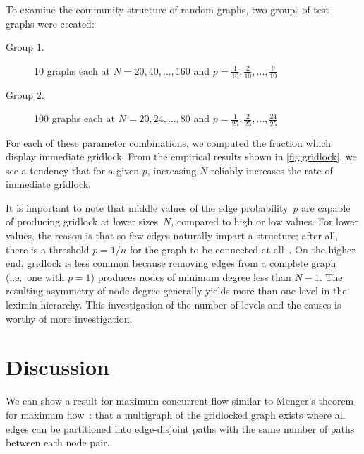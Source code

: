 To examine the community structure of random graphs, two groups of test graphs were created:
\begin{description}
\item[Group 1.] 10 graphs each at $N = 20, 40, \ldots, 160$ and $p = \frac{1}{10}, \frac{2}{10}, \ldots, \frac{9}{10}$
\item[Group 2.] 100 graphs each at $N = 20, 24, \ldots, 80$ and $p = \frac{1}{25}, \frac{2}{25}, \ldots, \frac{24}{25}$
\end{description}
For each of these parameter combinations, we computed the fraction which display immediate gridlock. From the empirical results shown in \autoref{fig:gridlock}, we see a tendency that for a given $p$, increasing $N$ reliably increases the rate of immediate gridlock.

It is important to note that middle values of the edge probability~$p$ are capable of producing gridlock at lower sizes~$N$, compared to high or low values. For lower values, the reason is that so few edges naturally impart a structure; after all, there is a threshold $p = 1/n$ for the graph to be connected at all~\cite{frieze2015introduction, janson2011random}. On the higher end, gridlock is less common because removing edges from a complete graph (i.e.\ one with $p=1$) produces nodes of minimum degree less than $N - 1$. The resulting asymmetry of node degree generally yields more than one level in the leximin hierarchy. This investigation of the number of levels and the causes is worthy of more investigation.





\section{Discussion}

We can show a result for maximum concurrent flow similar to Menger's theorem for maximum flow~\cite{menger1927allgemeinen}: that a multigraph of the gridlocked graph exists where all edges can be partitioned into edge-disjoint paths with the same number of paths between each node pair.

